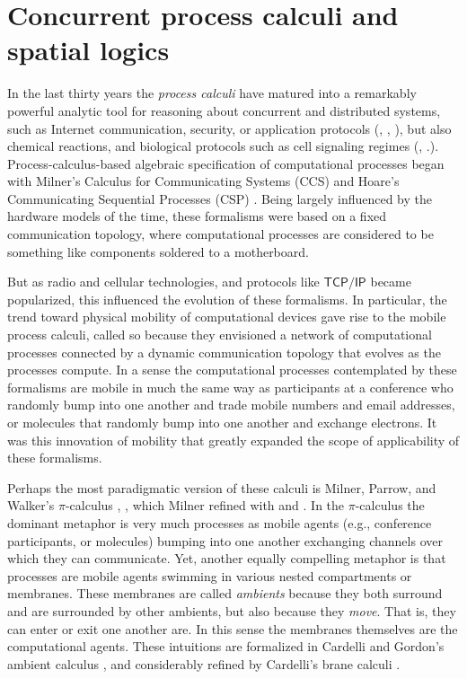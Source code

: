 \section{Concurrent process calculi and spatial logics }\label{sec:concurrent_process_calculi_and_spatial_logics_} %
In the last thirty years the \emph{process calculi} have matured into
a remarkably powerful analytic tool for reasoning about concurrent and
distributed systems, such as Internet communication, security, or
application protocols (\cite{DBLP:conf/popl/AbadiB02},
\cite{DBLP:conf/epew/BrownLM05}, \cite{DBLP:conf/fossacs/LaneveZ05}),
but also chemical reactions, and biological protocols such as cell
signaling regimes (\cite{DBLP:conf/psb/RegevSS01},
\cite{DBLP:journals/ipl/PriamiRSS01}.). Process-calculus-based
algebraic specification of computational processes began with Milner's
Calculus for Communicating Systems (CCS) \cite{DBLP:books/sp/Milner80}
and Hoare's Communicating Sequential Processes (CSP)
\cite{DBLP:books/ph/Hoare85}. Being largely influenced by the hardware
models of the time, these formalisms were based on a fixed
communication topology, where computational processes are considered
to be something like components soldered to a motherboard.

But as radio and cellular technologies, and protocols like
$\mathsf{TCP/IP}$ became popularized, this influenced the evolution of
these formalisms. In particular, the trend toward physical mobility of
computational devices gave rise to the mobile process calculi, called
so because they envisioned a network of computational processes
connected by a dynamic communication topology that evolves as the
processes compute. In a sense the computational processes contemplated
by these formalisms are mobile in much the same way as participants at
a conference who randomly bump into one another and trade mobile
numbers and email addresses, or molecules that randomly bump into one
another and exchange electrons. It was this innovation of mobility
that greatly expanded the scope of applicability of these formalisms.

Perhaps the most paradigmatic version of these calculi is Milner,
Parrow, and Walker's $\pi$-calculus
\cite{DBLP:journals/iandc/MilnerPW92a},
\cite{DBLP:journals/iandc/MilnerPW92b}, which Milner refined with
\cite{DBLP:journals/mscs/Milner92} and \cite{milner91polyadicpi}. In
the $\pi$-calculus the dominant metaphor is very much processes as
mobile agents (e.g., conference participants, or molecules) bumping
into one another exchanging channels over which they can
communicate. Yet, another equally compelling metaphor is that
processes are mobile agents swimming in various nested compartments or
membranes. These membranes are called \emph{ambients} because they
both surround and are surrounded by other ambients, but also because
they \emph{move}. That is, they can enter or exit one another are. In
this sense the membranes themselves are the computational
agents. These intuitions are formalized in Cardelli and Gordon's
ambient calculus \cite{DBLP:journals/tcs/CardelliG00}, and
considerably refined by Cardelli's brane calculi
\cite{DBLP:conf/cmsb/Cardelli04}.

